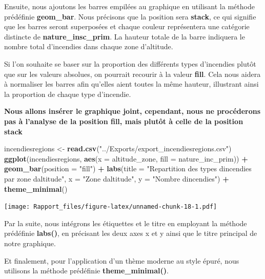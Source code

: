 \documentclass[
]{article}
\newenvironment{Shaded}{\begin{snugshade}}{\end{snugshade}}
\newcommand{\AttributeTok}[1]{\textcolor[rgb]{0.13,0.29,0.53}{#1}}
\newcommand{\FunctionTok}[1]{\textcolor[rgb]{0.13,0.29,0.53}{\textbf{#1}}}
\newcommand{\NormalTok}[1]{#1}
\newcommand{\OtherTok}[1]{\textcolor[rgb]{0.56,0.35,0.01}{#1}}
\newcommand{\SpecialCharTok}[1]{\textcolor[rgb]{0.81,0.36,0.00}{\textbf{#1}}}
\newcommand{\StringTok}[1]{\textcolor[rgb]{0.31,0.60,0.02}{#1}}
\begin{document}
Ensuite, nous ajoutons les barres empilées au graphique en utilisant la
méthode prédéfinie \textbf{geom\_bar}. Nous précisons que la position
sera \textbf{stack}, ce qui signifie que les barres seront superposées
et chaque couleur représentera une catégorie distincte de
\textbf{nature\_insc\_prim}. La hauteur totale de la barre indiquera le
nombre total d'incendies dans chaque zone d'altitude.

Si l'on souhaite se baser sur la proportion des différents types
d'incendies plutôt que sur les valeurs absolues, on pourrait recourir à
la valeur \textbf{fill}. Cela nous aidera à normaliser les barres afin
qu'elles aient toutes la même hauteur, illustrant ainsi la proportion de
chaque type d'incendie.

\textbf{Nous allons insérer le graphique joint, cependant, nous ne
procéderons pas à l'analyse de la position fill, mais plutôt à celle de
la position stack}

\begin{Shaded}
\begin{Highlighting}[]
\NormalTok{incendiesregions }\OtherTok{\textless{}{-}} \FunctionTok{read.csv}\NormalTok{(}\StringTok{"../Exports/export\_incendiesregions.csv"}\NormalTok{)}
\FunctionTok{ggplot}\NormalTok{(incendiesregions, }\FunctionTok{aes}\NormalTok{(}\AttributeTok{x =}\NormalTok{ altitude\_zone, }\AttributeTok{fill =}\NormalTok{ nature\_inc\_prim)) }\SpecialCharTok{+}
  \FunctionTok{geom\_bar}\NormalTok{(}\AttributeTok{position =} \StringTok{"fill"}\NormalTok{) }\SpecialCharTok{+}
  \FunctionTok{labs}\NormalTok{(}\AttributeTok{title =} \StringTok{"Repartition des types d\textquotesingle{}incendies par zone d\textquotesingle{}altitude"}\NormalTok{,}
       \AttributeTok{x =} \StringTok{"Zone d\textquotesingle{}altitude"}\NormalTok{, }\AttributeTok{y =} \StringTok{"Nombre d\textquotesingle{}incendies"}\NormalTok{) }\SpecialCharTok{+}
  \FunctionTok{theme\_minimal}\NormalTok{()}
\end{Highlighting}
\end{Shaded}

\texttt{[image: Rapport\_files/figure-latex/unnamed-chunk-18-1.pdf]}

Par la suite, nous intégrons les étiquettes et le titre en employant la
méthode prédéfinie \textbf{labs()}, en précisant les deux axes x et y
ainsi que le titre principal de notre graphique.

Et finalement, pour l'application d'un thème moderne au style épuré,
nous utilisons la méthode prédéfinie \textbf{theme\_minimal()}.
\end{document}

